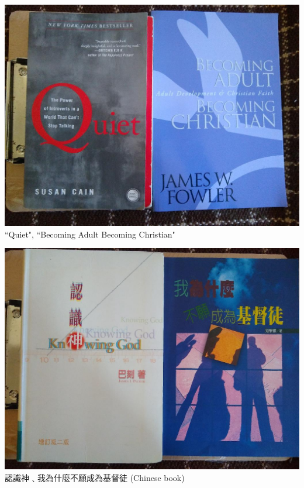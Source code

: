 \documentclass[t]{beamer}
\newcommand{\htarget}[2]{\hypertarget{#1}{#2}}
\begin{document}
\begin{frame}\htarget{quiet}{} \begin{center}
\includegraphics[height=0.8\textheight]{book02_mini.jpg} \\
``Quiet", ``Becoming Adult Becoming Christian"
\end{center} \end{frame}
\begin{frame}\htarget{know}{} \begin{center}
\includegraphics[height=0.8\textheight]{book03_mini.jpg} \\
認識神﹑我為什麼不願成為基督徒 (Chinese book)
\end{center} \end{frame}
\end{document}

